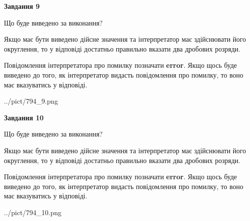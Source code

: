 \documentclass[12pt, ukrainian]{article}
\begin{document}
{\begin {Large}
{\begin {center}\textbf{Завдання 9}\end {center}}\par
Що буде виведено за виконання? \par

Якщо має бути виведено дійсне значення та інтерпретатор має здійснювати його округлення, 
то у відповіді достатньо правильно вказати два дробових розряди.

Повідомлення інтерпретатора про помилку позначати \textbf{error}.
Якщо щось буде виведено до того, як інтерпретатор видасть повідомлення про помилку, 
то воно має вказуватись у відповіді. \par

\begin{center}
	{../pict/794_9.png}
\end{center}
\newpage

{\begin {center}\textbf{Завдання 10}\end {center}}\par
Що буде виведено за виконання? \par

Якщо має бути виведено дійсне значення та інтерпретатор має здійснювати його округлення, 
то у відповіді достатньо правильно вказати два дробових розряди.

Повідомлення інтерпретатора про помилку позначати \textbf{error}.
Якщо щось буде виведено до того, як інтерпретатор видасть повідомлення про помилку, 
то воно має вказуватись у відповіді. \par

\begin{center}
	{../pict/794_10.png}
\end{center}
\newpage

\end {Large}}
\end{document}
